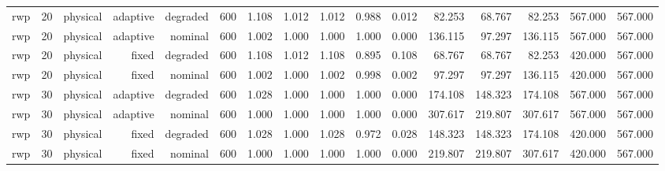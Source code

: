 \begin{tabular}{lrrrrrrrrrrrrrrr}
rwp & 20 & physical & adaptive & degraded & 600 & 1.108 & 1.012 & 1.012 & 0.988 & 0.012 & 82.253 & 68.767 & 82.253 & 567.000 & 567.000 \\
rwp & 20 & physical & adaptive & nominal & 600 & 1.002 & 1.000 & 1.000 & 1.000 & 0.000 & 136.115 & 97.297 & 136.115 & 567.000 & 567.000 \\
rwp & 20 & physical & fixed & degraded & 600 & 1.108 & 1.012 & 1.108 & 0.895 & 0.108 & 68.767 & 68.767 & 82.253 & 420.000 & 567.000 \\
rwp & 20 & physical & fixed & nominal & 600 & 1.002 & 1.000 & 1.002 & 0.998 & 0.002 & 97.297 & 97.297 & 136.115 & 420.000 & 567.000 \\
rwp & 30 & physical & adaptive & degraded & 600 & 1.028 & 1.000 & 1.000 & 1.000 & 0.000 & 174.108 & 148.323 & 174.108 & 567.000 & 567.000 \\
rwp & 30 & physical & adaptive & nominal & 600 & 1.000 & 1.000 & 1.000 & 1.000 & 0.000 & 307.617 & 219.807 & 307.617 & 567.000 & 567.000 \\
rwp & 30 & physical & fixed & degraded & 600 & 1.028 & 1.000 & 1.028 & 0.972 & 0.028 & 148.323 & 148.323 & 174.108 & 420.000 & 567.000 \\
rwp & 30 & physical & fixed & nominal & 600 & 1.000 & 1.000 & 1.000 & 1.000 & 0.000 & 219.807 & 219.807 & 307.617 & 420.000 & 567.000 \\
\bottomrule
\end{tabular}